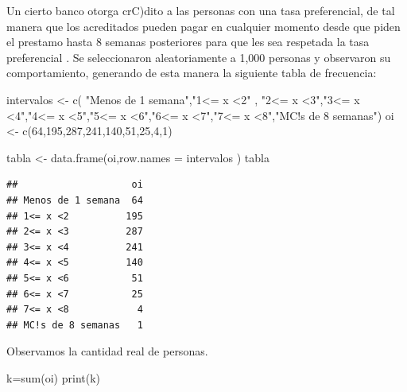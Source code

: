 \documentclass[
]{article}
\newenvironment{Shaded}{\begin{snugshade}}{\end{snugshade}}
\newcommand{\AttributeTok}[1]{\textcolor[rgb]{0.77,0.63,0.00}{#1}}
\newcommand{\DecValTok}[1]{\textcolor[rgb]{0.00,0.00,0.81}{#1}}
\newcommand{\FunctionTok}[1]{\textcolor[rgb]{0.00,0.00,0.00}{#1}}
\newcommand{\NormalTok}[1]{#1}
\newcommand{\OtherTok}[1]{\textcolor[rgb]{0.56,0.35,0.01}{#1}}
\newcommand{\StringTok}[1]{\textcolor[rgb]{0.31,0.60,0.02}{#1}}
\begin{document}
Un cierto banco otorga crC)dito a las personas con una tasa
preferencial, de tal manera que los acreditados pueden pagar en
cualquier momento desde que piden el prestamo hasta 8 semanas
posteriores para que les sea respetada la tasa preferencial . Se
seleccionaron aleatoriamente a 1,000 personas y observaron su
comportamiento, generando de esta manera la siguiente tabla de
frecuencia:

\begin{Shaded}
\begin{Highlighting}[]
\NormalTok{intervalos }\OtherTok{\textless{}{-}} \FunctionTok{c}\NormalTok{( }\StringTok{"Menos de 1 semana"}\NormalTok{,}\StringTok{"1\textless{}= x \textless{}2"}\NormalTok{ , }\StringTok{"2\textless{}= x \textless{}3"}\NormalTok{,}\StringTok{"3\textless{}= x \textless{}4"}\NormalTok{,}\StringTok{"4\textless{}= x \textless{}5"}\NormalTok{,}\StringTok{"5\textless{}= x \textless{}6"}\NormalTok{,}\StringTok{"6\textless{}= x \textless{}7"}\NormalTok{,}\StringTok{"7\textless{}= x \textless{}8"}\NormalTok{,}\StringTok{"MC!s de 8 semanas"}\NormalTok{)}
\NormalTok{oi }\OtherTok{\textless{}{-}} \FunctionTok{c}\NormalTok{(}\DecValTok{64}\NormalTok{,}\DecValTok{195}\NormalTok{,}\DecValTok{287}\NormalTok{,}\DecValTok{241}\NormalTok{,}\DecValTok{140}\NormalTok{,}\DecValTok{51}\NormalTok{,}\DecValTok{25}\NormalTok{,}\DecValTok{4}\NormalTok{,}\DecValTok{1}\NormalTok{)}

\NormalTok{tabla }\OtherTok{\textless{}{-}} \FunctionTok{data.frame}\NormalTok{(oi,}\AttributeTok{row.names =}\NormalTok{ intervalos )}
\NormalTok{tabla}
\end{Highlighting}
\end{Shaded}

\begin{verbatim}
##                    oi
## Menos de 1 semana  64
## 1<= x <2          195
## 2<= x <3          287
## 3<= x <4          241
## 4<= x <5          140
## 5<= x <6           51
## 6<= x <7           25
## 7<= x <8            4
## MC!s de 8 semanas   1
\end{verbatim}

Observamos la cantidad real de personas.

\begin{Shaded}
\begin{Highlighting}[]
\NormalTok{k}\OtherTok{=}\FunctionTok{sum}\NormalTok{(oi)}
\FunctionTok{print}\NormalTok{(k)}
\end{Highlighting}
\end{Shaded}
\end{document}
